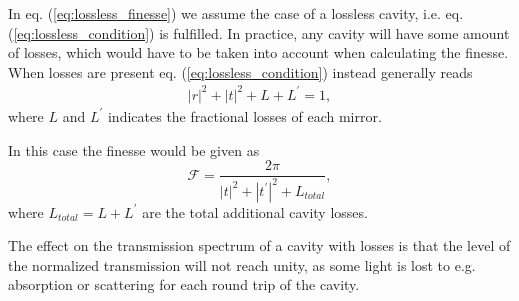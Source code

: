 In eq. (\ref{eq:lossless_finesse}) we assume the case of a lossless cavity, i.e. eq. (\ref{eq:lossless_condition}) is fulfilled. In practice, any cavity will have some amount of losses, which would have to be taken into account when calculating the finesse. When losses are present eq. (\ref{eq:lossless_condition}) instead generally reads
\begin{eqnarray}
    |r|^2 + |t|^2 + L + L^{\prime} = 1,
\end{eqnarray}
where $L$ and $L^{\prime}$ indicates the fractional losses of each mirror.

In this case the finesse would be given as 
\begin{equation}
    \mathcal{F} = \frac{2 \pi}{|t|^2 + |t^{\prime}|^2 + L_{total}},
\end{equation}
where $L_{total} = L + L^{\prime}$ are the total additional cavity losses.

The effect on the transmission spectrum of a cavity with losses is that the level of the normalized transmission will not reach unity, as some light is lost to e.g. absorption or scattering for each round trip of the cavity.
